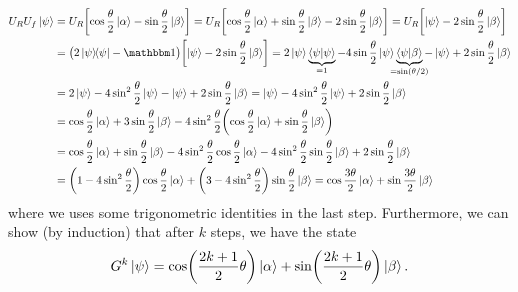 				\begin{align}
					U_R U_f \ket{\psi}
					 & = U_R \biggl[ \cos\frac{\theta}{2} \ket{\alpha} - \sin\frac{\theta}{2} \ket{\beta} \biggr]
					= U_R \biggl[ \cos\frac{\theta}{2} \ket{\alpha} + \sin\frac{\theta}{2} \ket{\beta} - 2 \sin\frac{\theta}{2} \ket{\beta} \biggr]
					= U_R \biggl[ \ket{\psi} - 2 \sin\frac{\theta}{2} \ket{\beta} \biggr]                                                                                                                                                                  \\
					 & = \bigl( 2 \ketbra{\psi}{\psi} - \ID \bigr) \biggl[ \ket{\psi} - 2 \sin\frac{\theta}{2} \ket{\beta} \biggr]
					= 2 \ket{\psi} \underbrace{\ip{\psi}{\psi}}_{\mathclap{= 1}} - 4 \sin\frac{\theta}{2} \ket{\psi} \underbrace{\ip{\psi}{\beta}}_{\mathclap{= \sin(\theta/2)}} - \ket{\psi} + 2 \sin\frac{\theta}{2} \ket{\beta}                         \\
					 & = 2 \ket{\psi} - 4 \sin^2\frac{\theta}{2} \ket{\psi} - \ket{\psi} + 2 \sin\frac{\theta}{2} \ket{\beta}
					= \ket{\psi} - 4 \sin^2\frac{\theta}{2} \ket{\psi} + 2 \sin\frac{\theta}{2} \ket{\beta}                                                                                                                                                \\
					 & = \cos\frac{\theta}{2} \ket{\alpha} + 3 \sin\frac{\theta}{2} \ket{\beta} - 4 \sin^2\frac{\theta}{2} \biggl( \cos\frac{\theta}{2} \ket{\alpha} + \sin\frac{\theta}{2} \ket{\beta} \biggr)                                            \\
					 & = \cos\frac{\theta}{2} \ket{\alpha} + \sin\frac{\theta}{2} \ket{\beta} - 4 \sin^2\frac{\theta}{2} \cos\frac{\theta}{2} \ket{\alpha} - 4 \sin^2\frac{\theta}{2}\sin\frac{\theta}{2} \ket{\beta} + 2 \sin\frac{\theta}{2} \ket{\beta} \\
					 & = \biggl( 1 - 4 \sin^2\frac{\theta}{2} \biggr) \cos\frac{\theta}{2} \ket{\alpha} + \biggl( 3 - 4 \sin^2\frac{\theta}{2} \biggr) \sin\frac{\theta}{2} \ket{\beta}
					= \cos\frac{3 \theta}{2} \ket{\alpha} + \sin\frac{3 \theta}{2} \ket{\beta}
				\end{align} %
				where we uses some trigonometric identities in the last step. Furthermore, we can show (by induction) that after \(k\) steps, we have the state
				\begin{equation}
					G^k \ket{\psi} = \cos(\frac{2k + 1}{2} \theta) \ket{\alpha} + \sin(\frac{2k + 1}{2} \theta) \ket{\beta}.
				\end{equation}
